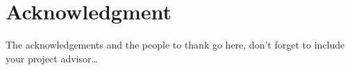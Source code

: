 \thispagestyle{empty}
\section*{Acknowledgment}

The acknowledgements and the people to thank go here, don't forget to include your project advisor\ldots

\newpage
\thispagestyle{empty}
\mbox{}
\newpage